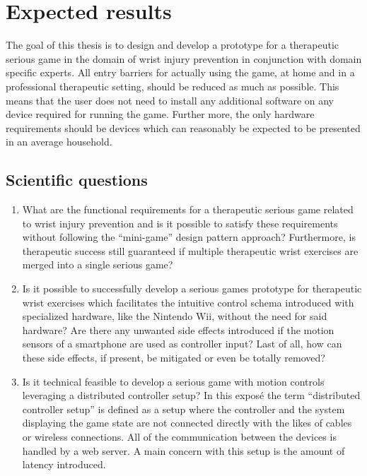 \section{Expected results}

The goal of this thesis is to design and develop a prototype for a therapeutic serious game in the domain of wrist injury prevention in conjunction with domain specific experts. 
All entry barriers for actually using the game, at home and in a professional therapeutic setting, should be reduced as much as possible. 
This means that the user does not need to install any additional software on any device required for running the game. 
Further more, the only hardware requirements should be devices which can reasonably be expected to be presented in an average household. 

\subsection{Scientific questions}

\begin{enumerate}
	\item What are the functional requirements for a therapeutic serious game related to wrist injury prevention and is it possible to satisfy these requirements without following the “mini-game” design pattern approach? Furthermore, is therapeutic success still guaranteed if multiple therapeutic wrist exercises are merged into a single serious game?
	\item Is it possible to successfully develop a serious games prototype for therapeutic wrist exercises which facilitates the intuitive control schema introduced with specialized hardware, like the Nintendo Wii, without the need for said hardware? Are there any unwanted side effects introduced if the motion sensors of a smartphone are used as controller input? Last of all, how can these side effects, if present, be mitigated or even be totally removed?
	\item Is it technical feasible to develop a serious game with motion controls leveraging a distributed controller setup? In this exposé the term “distributed controller setup” is defined as a setup where the controller and the system displaying the game state are not connected directly with the likes of cables or wireless connections. All of the communication between the devices is handled by a web server. A main concern with this setup is the amount of latency introduced.
\end{enumerate}

